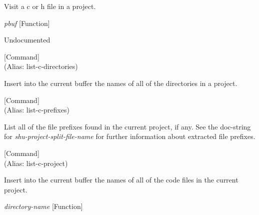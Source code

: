 \begin{doc-string}
Visit a c or h file in a project.
\end{doc-string}

\vspace{1em}
\noindent
{}
\usebox{\funcname}\emph{pbuf}
 \hfill [Function]

\begin{doc-string}
Undocumented
\end{doc-string}

\vspace{1em}
\noindent
{}
\usebox{\funcname}
 \hfill [Command]\\%
 (Alias: list-c-directories)

\begin{doc-string}
Insert into the current buffer the names of all of the directories in a project.
\end{doc-string}

\vspace{1em}
\noindent
{}
\usebox{\funcname}
 \hfill [Command]\\%
 (Alias: list-c-prefixes)

\begin{doc-string}
List all of the file prefixes found in the current project, if any.
See the doc-string for \emph{shu-project-split-file-name} for further information
about extracted file prefixes.
\end{doc-string}

\vspace{1em}
\noindent
{}
\usebox{\funcname}
 \hfill [Command]\\%
 (Alias: list-c-project)

\begin{doc-string}
Insert into the current buffer the names of all of the code files in the
current project.
\end{doc-string}

\vspace{1em}
\noindent
{}
\usebox{\funcname}\emph{directory-name}
 \hfill [Function]

